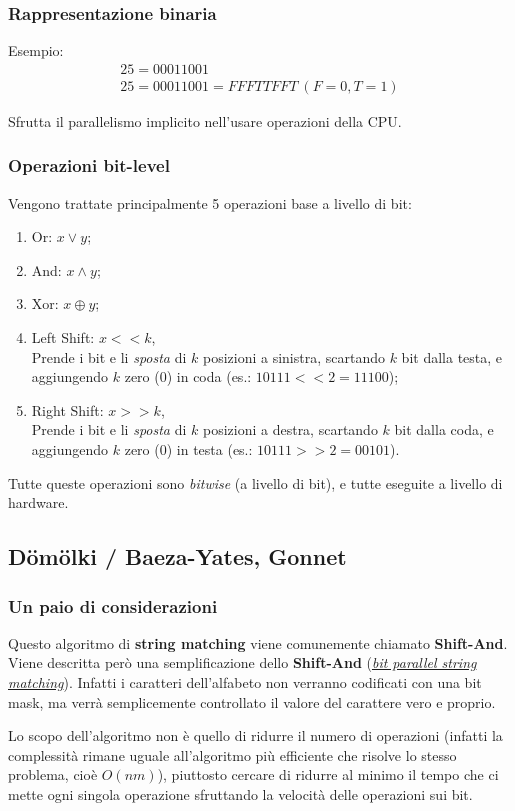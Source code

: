 \subsubsection{Rappresentazione binaria}
Esempio: \begin{gather*}
    25 = 00011001 \\
    25 = 00011001 = FFFTTFFT\ (F = 0, T = 1)
\end{gather*}

Sfrutta il parallelismo implicito nell'usare operazioni della CPU.

\subsubsection{Operazioni bit-level}
Vengono trattate principalmente 5 operazioni base a livello di bit:
\begin{enumerate}
    \item Or: $x \lor y$;
    \item And: $x \land y$;
    \item Xor: $x \oplus y$;
    \item Left Shift: $x << k$, \\
    Prende i bit e li \textit{sposta} di $k$ posizioni a sinistra, scartando $k$ bit dalla testa, e aggiungendo $k$ zero ($0$) in coda (es.: $10111 << 2 = 11100$);
    \item Right Shift: $x >> k$, \\
    Prende i bit e li \textit{sposta} di $k$ posizioni a destra, scartando $k$ bit dalla coda, e aggiungendo $k$ zero ($0$) in testa (es.: $10111 >> 2 = 00101$).
\end{enumerate}
Tutte queste operazioni sono \textit{bitwise} (a livello di bit), e tutte eseguite a livello di hardware.

\subsection{Dömölki / Baeza-Yates, Gonnet}
\subsubsection{Un paio di considerazioni}
Questo algoritmo di \textbf{string matching} viene comunemente chiamato \textbf{Shift-And}. Viene descritta però una semplificazione dello \textbf{Shift-And} (\href{http://www.cs.joensuu.fi/pages/whamalai/sciwri/alina.pdf}{\textit{bit parallel string matching}}). Infatti i caratteri dell'alfabeto non verranno codificati con una bit mask, ma verrà semplicemente controllato il valore del carattere vero e proprio. \par
Lo scopo dell'algoritmo non è quello di ridurre il numero di operazioni (infatti la complessità rimane uguale all'algoritmo più efficiente che risolve lo stesso problema, cioè $O(nm)$), piuttosto cercare di ridurre al minimo il tempo che ci mette ogni singola operazione sfruttando la velocità delle operazioni sui bit.


